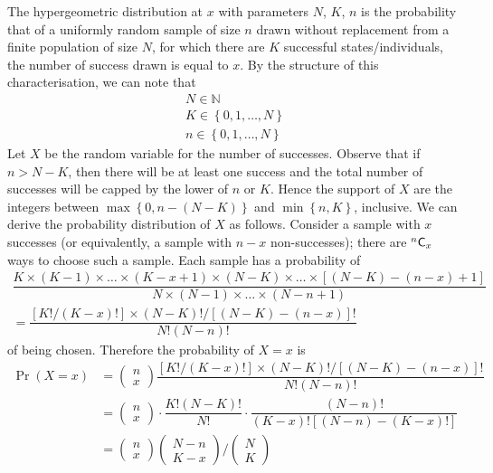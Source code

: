 \documentclass[11pt]{report} %
\begin{document}
The hypergeometric distribution at $x$ with parameters $N$, $K$, $n$ is the probability that of a uniformly random sample of size $n$ drawn without replacement from a finite population of size $N$, for which there are $K$ successful states/individuals, the number of success drawn is equal to $x$. By the structure of this characterisation, we can note that
\begin{gather}
N \in \mathbb{N} \\
K \in \left\{0, 1, \dots, N\right\} \\
n \in \left\{0, 1, \dots, N\right\}
\end{gather}
Let $X$ be the random variable for the number of successes. Observe that if $n > N - K$, then there will be at least one success and the total number of successes will be capped by the lower of $n$ or $K$. Hence the support of $X$ are the integers between $\max\left\{0, n - \left(N - K\right)\right\}$ and $\min\left\{n, K\right\}$, inclusive. We can derive the probability distribution of $X$ as follows. Consider a sample with $x$ successes (or equivalently, a sample with $n - x$ non-successes); there are $\mathstrut^{n}\mathsf{C}_{x}$ ways to choose such a sample. Each sample has a probability of
\begin{multline}
\dfrac{K\times\left(K - 1\right)\times\dots\times\left(K - x + 1\right)\times \left(N - K\right)\times\dots\times\left[\left(N - K\right) - \left(n - x\right) + 1\right]}{N\times\left(N - 1\right)\times\dots\times\left(N - n + 1\right)} \\
= \dfrac{\left[K!/\left(K - x\right)!\right]\times\left(N - K\right)!/\left[\left(N - K\right) - \left(n - x\right)\right]!}{N!\left(N - n\right)!}
\end{multline}
of being chosen. Therefore the probability of $X = x$ is
\begin{align}
\operatorname{Pr}\left(X = x\right) &= \begin{pmatrix}n \\ x\end{pmatrix}\dfrac{\left[K!/\left(K - x\right)!\right]\times\left(N - K\right)!/\left[\left(N - K\right) - \left(n - x\right)\right]!}{N!\left(N - n\right)!} \\
&= \begin{pmatrix}n \\ x\end{pmatrix}\cdot\dfrac{K!\left(N - K\right)!}{N!}\cdot\dfrac{\left(N - n\right)!}{\left(K - x\right)!\left[\left(N - n\right) - \left(K - x\right)!\right]} \\
&= \begin{pmatrix}n \\ x\end{pmatrix}\begin{pmatrix}N - n \\ K - x\end{pmatrix}/\begin{pmatrix}N \\ K\end{pmatrix}
\end{align}
\end{document}
